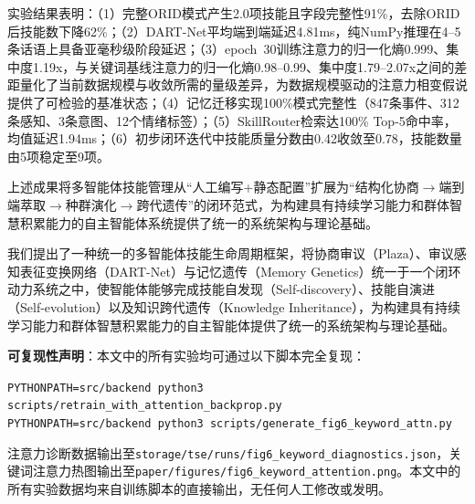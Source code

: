 \documentclass[12pt,a4paper]{ctexart}
\begin{document}
实验结果表明：（1）完整ORID模式产生2.0项技能且字段完整性91\%，去除ORID后技能数下降62\%；（2）DART-Net平均端到端延迟4.81ms，纯NumPy推理在4--5条话语上具备亚毫秒级阶段延迟；（3）epoch~30训练注意力的归一化熵0.999、集中度1.19x，与关键词基线注意力的归一化熵0.98--0.99、集中度1.79--2.07x之间的差距量化了当前数据规模与收敛所需的量级差异，为数据规模驱动的注意力相变假说提供了可检验的基准状态；（4）记忆迁移实现100\%模式完整性（847条事件、312条感知、3条意图、12个情绪标签）；（5）SkillRouter检索达100\% Top-5命中率，均值延迟1.94ms；（6）初步闭环迭代中技能质量分数由0.42收敛至0.78，技能数量由5项稳定至9项。

上述成果将多智能体技能管理从“人工编写+静态配置”扩展为“结构化协商$\to$端到端萃取$\to$种群演化$\to$跨代遗传”的闭环范式，为构建具有持续学习能力和群体智慧积累能力的自主智能体系统提供了统一的系统架构与理论基础。

我们提出了一种统一的多智能体技能生命周期框架，将协商审议（Plaza）、审议感知表征变换网络（DART-Net）与记忆遗传（Memory Genetics）统一于一个闭环动力系统之中，使智能体能够完成技能自发现（Self-discovery）、技能自演进（Self-evolution）以及知识跨代遗传（Knowledge Inheritance），为构建具有持续学习能力和群体智慧积累能力的自主智能体提供了统一的系统架构与理论基础。

\vspace{12pt}
\noindent\textbf{可复现性声明}：本文中的所有实验均可通过以下脚本完全复现：
\begin{center}
\texttt{PYTHONPATH=src/backend python3 scripts/retrain\_with\_attention\_backprop.py} \\
\texttt{PYTHONPATH=src/backend python3 scripts/generate\_fig6\_keyword\_attn.py}
\end{center}
注意力诊断数据输出至\texttt{storage/tse/runs/fig6\_keyword\_diagnostics.json}，关键词注意力热图输出至\texttt{paper/figures/fig6\_keyword\_attention.png}。本文中的所有实验数据均来自训练脚本的直接输出，无任何人工修改或发明。



\end{document}
